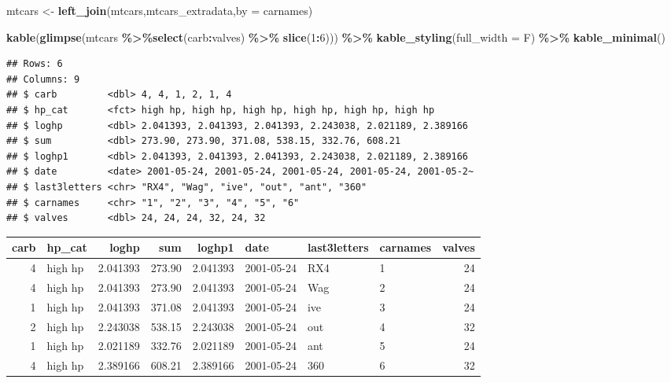 \documentclass[
]{article}
\newenvironment{Shaded}{\begin{snugshade}}{\end{snugshade}}
\newcommand{\AttributeTok}[1]{\textcolor[rgb]{0.13,0.29,0.53}{#1}}
\newcommand{\DecValTok}[1]{\textcolor[rgb]{0.00,0.00,0.81}{#1}}
\newcommand{\FunctionTok}[1]{\textcolor[rgb]{0.13,0.29,0.53}{\textbf{#1}}}
\newcommand{\NormalTok}[1]{#1}
\newcommand{\OtherTok}[1]{\textcolor[rgb]{0.56,0.35,0.01}{#1}}
\newcommand{\SpecialCharTok}[1]{\textcolor[rgb]{0.81,0.36,0.00}{\textbf{#1}}}
\newcommand{\StringTok}[1]{\textcolor[rgb]{0.31,0.60,0.02}{#1}}
\begin{document}
\begin{Shaded}
\begin{Highlighting}[]
\NormalTok{mtcars }\OtherTok{\textless{}{-}} \FunctionTok{left\_join}\NormalTok{(mtcars,mtcars\_extradata,}\AttributeTok{by =} \StringTok{\textquotesingle{}carnames\textquotesingle{}}\NormalTok{)}

\FunctionTok{kable}\NormalTok{(}\FunctionTok{glimpse}\NormalTok{(mtcars }\SpecialCharTok{\%\textgreater{}\%}\FunctionTok{select}\NormalTok{(carb}\SpecialCharTok{:}\NormalTok{valves) }\SpecialCharTok{\%\textgreater{}\%}  \FunctionTok{slice}\NormalTok{(}\DecValTok{1}\SpecialCharTok{:}\DecValTok{6}\NormalTok{))) }\SpecialCharTok{\%\textgreater{}\%}
  \FunctionTok{kable\_styling}\NormalTok{(}\AttributeTok{full\_width =}\NormalTok{ F) }\SpecialCharTok{\%\textgreater{}\%}
  \FunctionTok{kable\_minimal}\NormalTok{()}
\end{Highlighting}
\end{Shaded}

\begin{verbatim}
## Rows: 6
## Columns: 9
## $ carb         <dbl> 4, 4, 1, 2, 1, 4
## $ hp_cat       <fct> high hp, high hp, high hp, high hp, high hp, high hp
## $ loghp        <dbl> 2.041393, 2.041393, 2.041393, 2.243038, 2.021189, 2.389166
## $ sum          <dbl> 273.90, 273.90, 371.08, 538.15, 332.76, 608.21
## $ loghp1       <dbl> 2.041393, 2.041393, 2.041393, 2.243038, 2.021189, 2.389166
## $ date         <date> 2001-05-24, 2001-05-24, 2001-05-24, 2001-05-24, 2001-05-2~
## $ last3letters <chr> "RX4", "Wag", "ive", "out", "ant", "360"
## $ carnames     <chr> "1", "2", "3", "4", "5", "6"
## $ valves       <dbl> 24, 24, 24, 32, 24, 32
\end{verbatim}

\begin{table}
\centering
\begin{tabular}{r|l|r|r|r|l|l|l|r}
\hline
carb & hp\_cat & loghp & sum & loghp1 & date & last3letters & carnames & valves\\
\hline
4 & high hp & 2.041393 & 273.90 & 2.041393 & 2001-05-24 & RX4 & 1 & 24\\
\hline
4 & high hp & 2.041393 & 273.90 & 2.041393 & 2001-05-24 & Wag & 2 & 24\\
\hline
1 & high hp & 2.041393 & 371.08 & 2.041393 & 2001-05-24 & ive & 3 & 24\\
\hline
2 & high hp & 2.243038 & 538.15 & 2.243038 & 2001-05-24 & out & 4 & 32\\
\hline
1 & high hp & 2.021189 & 332.76 & 2.021189 & 2001-05-24 & ant & 5 & 24\\
\hline
4 & high hp & 2.389166 & 608.21 & 2.389166 & 2001-05-24 & 360 & 6 & 32\\
\hline
\end{tabular}
\end{table}
\end{document}
